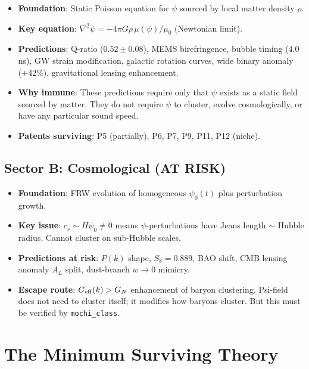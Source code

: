 \documentclass[11pt]{article}
\begin{document}
\begin{itemize}
\item \textbf{Foundation}: Static Poisson equation for $\psi$ sourced by
  local matter density $\rho$.
\item \textbf{Key equation}: $\nabla^2\psi = -4\pi G\rho\,\mu(\psi)/\mu_0$
  (Newtonian limit).
\item \textbf{Predictions}: Q-ratio ($0.52\pm0.08$), MEMS birefringence,
  bubble timing (4.0\,ns), GW strain modification, galactic rotation curves,
  wide binary anomaly (+42\%), gravitational lensing enhancement.
\item \textbf{Why immune}: These predictions require only that $\psi$ exists
  as a static field sourced by matter. They do not require $\psi$ to
  cluster, evolve cosmologically, or have any particular sound speed.
\item \textbf{Patents surviving}: P5 (partially), P6, P7, P9, P11, P12 (niche).
\end{itemize}

\subsection{Sector B: Cosmological (AT RISK)}

\begin{itemize}
\item \textbf{Foundation}: FRW evolution of homogeneous $\psi_0(t)$ plus
  perturbation growth.
\item \textbf{Key issue}: $c_s \sim H\psi_0 \neq 0$ means $\psi$-perturbations
  have Jeans length $\sim$ Hubble radius. Cannot cluster on sub-Hubble scales.
\item \textbf{Predictions at risk}: $P(k)$ shape, $S_8 = 0.889$, BAO shift,
  CMB lensing anomaly $A_L$ split, dust-branch $w \to 0$ mimicry.
\item \textbf{Escape route}: $G_{\rm eff}(k) > G_N$ enhancement of baryon
  clustering. Psi-field does not need to cluster itself; it modifies how
  baryons cluster. But this must be verified by \texttt{mochi\_class}.
\end{itemize}

\section{The Minimum Surviving Theory}
\end{document}
